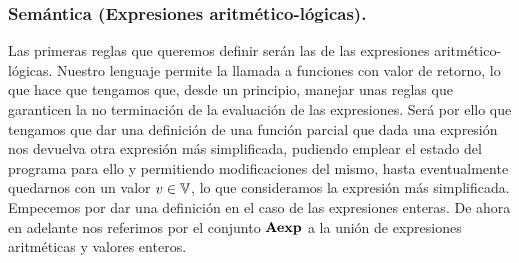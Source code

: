 \subsubsection{Semántica (Expresiones aritmético-lógicas).}
Las primeras reglas que queremos definir serán las de las expresiones aritmético-lógicas. Nuestro lenguaje permite la llamada a funciones con valor de retorno, lo que hace que tengamos que, desde un principio, manejar unas reglas que garanticen la no terminación de la evaluación de las expresiones. Será por ello que tengamos que dar una definición de una función parcial que dada una expresión nos devuelva otra expresión más simplificada, pudiendo emplear el estado del programa para ello y permitiendo modificaciones del mismo, hasta eventualmente quedarnos con un valor $v \in \mathbb{V}$, lo que consideramos la expresión más simplificada.\\

Empecemos por dar una definición en el caso de las expresiones enteras. De ahora en adelante nos referimos por el conjunto $\textbf{Aexp}$ a la unión de expresiones aritméticas y valores enteros.\\

